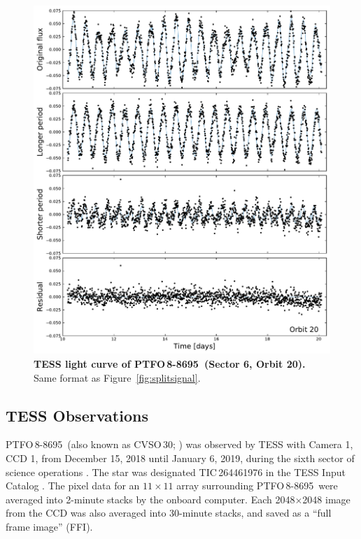 \documentclass[12pt,twocolumn,tighten]{aastex62}
\newcommand{\ptfo}{PTFO$\,$8-8695}
\begin{document}
\begin{figure}[hbtp]
	\begin{center}
		\leavevmode
		\includegraphics[width=1\textwidth]{f2.pdf}
	\end{center}
	\vspace{-0.7cm}
  \caption{ {\bf TESS light curve of \ptfo\ (Sector 6, Orbit 20).} Same
  format as Figure~\ref{fig:splitsignal}.
  \label{fig:splitsignalii}
	}
\end{figure}

\subsection{TESS Observations}

\ptfo\ (also known as CVSO\,30; \citealt{briceno_cida_2005}) was
observed by TESS with Camera 1, CCD 1, from December 15, 2018 until
January 6, 2019, during the sixth sector of science operations
\citep{ricker_transiting_2015}.  The star was designated
TIC\,264461976 in the TESS Input Catalog
\citep{stassun_TIC_2018,stassun_TIC8_2019}.  The pixel data for an
$11\times11$ array surrounding \ptfo\ were averaged into 2-minute
stacks by the onboard computer.  Each 2048$\times$2048 image from the
CCD was also averaged into 30-minute stacks, and saved as a ``full
frame image'' (FFI).
\end{document}
